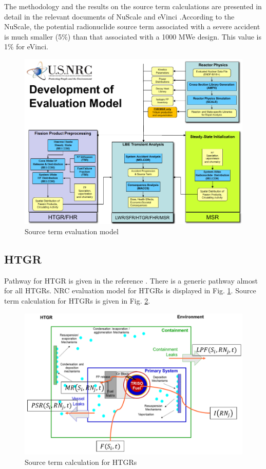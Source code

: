 The methodology and the results on the source term calculations are presented in detail in the relevant documents of NuScale \cite{nuscale_chapter_2018-1} and eVinci \cite{maioli_westinghouse_2019}.According to the NuScale, the potential radionuclide source term associated with a severe accident is much smaller (5\%) than that associated with a 1000 MWe design. This value is 1\% for eVinci. 

\begin{figure}[hbtp]
\centering
\includegraphics[scale=0.6]{Figs/sourceterm.jpeg}
\caption{Source term evaluation model}
\label{sourceterm}
\end{figure}

\subsection{HTGR}
Pathway for HTGR is given in the reference  \cite{inl_htgr_2010}. There is a generic pathway almost for all HTGRs. NRC evaluation model for HTGRs is displayed in Fig. \ref{sourceterm}. Source term calculation for HTGRs is given in Fig.  \ref{htgrsourceterm}. 

\begin{figure}[hbtp]
\centering
\includegraphics[scale=0.5]{Figs/htgrsourceterm.jpeg}
\caption{Source term calculation for HTGRs}
\label{htgrsourceterm}
\end{figure}

